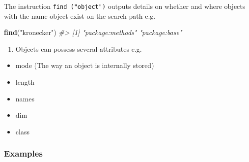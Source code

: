 \documentclass[
]{book}
\newenvironment{Shaded}{\begin{snugshade}}{\end{snugshade}}
\newcommand{\CommentTok}[1]{\textcolor[rgb]{0.56,0.35,0.01}{\textit{#1}}}
\newcommand{\FunctionTok}[1]{\textcolor[rgb]{0.13,0.29,0.53}{\textbf{#1}}}
\newcommand{\NormalTok}[1]{#1}
\newcommand{\StringTok}[1]{\textcolor[rgb]{0.31,0.60,0.02}{#1}}
\providecommand{\tightlist}{%
  \setlength{\itemsep}{0pt}\setlength{\parskip}{0pt}}
\begin{document}
The instruction \texttt{find\ ("object")} outputs details on whether and where objects with the name object exist on the search path e.g.

\begin{Shaded}
\begin{Highlighting}[]
\FunctionTok{find}\NormalTok{(}\StringTok{"kronecker"}\NormalTok{)}
\CommentTok{\#\textgreater{} [1] "package:methods" "package:base"}
\end{Highlighting}
\end{Shaded}

\begin{enumerate}
\def\labelenumi{(\alph{enumi})}
\setcounter{enumi}{3}
\tightlist
\item
  Objects can possess several attributes e.g.~
\end{enumerate}

\begin{itemize}
\tightlist
\item
  mode (The way an object is internally stored)
\item
  length
\item
  names
\item
  dim
\item
  class
\end{itemize}

\subsubsection*{Examples}\label{examples-1}
\end{document}
